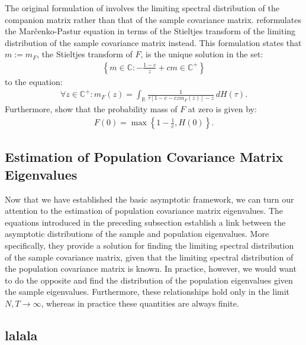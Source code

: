 The original formulation of \textcite{MP1967} involves the limiting spectral distribution of the companion matrix rather than that of the sample covariance matrix. \textcite{SILVERSTEIN1995} reformulates the Marčenko-Pastur equation in terms of the Stieltjes transform of the limiting distribution of the sample covariance matrix instead. This formulation states that $m := m_{F}$, the Stieltjes transform of $F$, is the unique solution in the set:
\begin{align}
	\left\{ m\in \mathbb{C} : - \frac{1-c}{z} + cm \in \mathbb{C}^{+} \right\}
\end{align}
to the equation:
\begin{align}
	\forall z \in \mathbb{C}^{+} : m_F(z) = \int_{\mathbb{R}} \frac{1}{\tau [ 1 - c - czm_F(z) ] - z} \, dH(\tau).
\end{align}
Furthermore, \textcite{SILVERSTEIN_CHOI_1995} show that the probability mass of $F$ at zero is given by:
\begin{align}
	F(0) = \max \left\{ 1 - \frac{1}{c}, H(0) \right\}.
\end{align}

\subsection{Estimation of Population Covariance Matrix Eigenvalues}
Now that we have established the basic asymptotic framework, we can turn our attention to the estimation of population covariance matrix eigenvalues. The equations introduced in the preceding subsection establish a link between the asymptotic distributions of the sample and population eigenvalues. More specifically, they provide a solution for finding the limiting spectral distribution of the sample covariance matrix, given that the limiting spectral distribution of the population covariance matrix is known. In practice, however, we would want to do the opposite and find the distribution of the population eigenvalues given the sample eigenvalues. Furthermore, these relationships hold only in the limit $N,T \to \infty$, whereas in practice these quantities are always finite. 


\subsection{lalala}

























